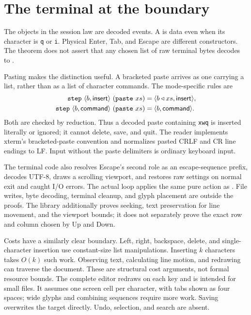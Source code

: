 \documentclass[11pt]{article}
\newcommand{\code}[1]{\texttt{\detokenize{#1}}}
\newcommand{\ins}{\mathbin{\triangleleft}}
\newcommand{\cmd}{\mathsf{command}}
\newcommand{\insertmode}{\mathsf{insert}}
\begin{document}
\section{The terminal at the boundary}
\label{sec:boundary}

The objects in the session law are decoded events. A \code{Key.character} is
data even when its character is \texttt{q} or \texttt{i}. Physical Enter, Tab,
and Escape are different constructors. The theorem does not assert that any
chosen list of raw terminal bytes decodes to \code{chars xs}.

Pasting makes the distinction useful. A bracketed paste arrives as one
\code{Key.paste} carrying a list, rather than as a list of character commands.
The mode-specific rules are
\begin{align*}
 \code{step}\ \langle b,\insertmode\rangle\ (\code{paste}\ xs)
   &=\langle b\ins xs,\insertmode\rangle,\\
 \code{step}\ \langle b,\cmd\rangle\ (\code{paste}\ xs)
   &=\langle b,\cmd\rangle.
\end{align*}
Both are checked by reduction. Thus a decoded paste containing \texttt{xwq}
is inserted literally or ignored; it cannot delete, save, and quit. The reader
implements xterm's bracketed-paste convention \citep{xterm} and normalizes
pasted CRLF and CR line endings to LF. Input without the paste delimiters is
ordinary keyboard input.

The terminal code also resolves Escape's second role as an escape-sequence
prefix, decodes UTF-8, draws a scrolling viewport, and restores raw settings
on normal exit and caught I/O errors. The actual loop applies the same pure
action as \code{step}. File writes, byte decoding, terminal cleanup, and glyph
placement are outside the proofs. The library additionally proves seeking,
text preservation for line movement, and the viewport bounds; it does not
separately prove the exact row and column chosen by Up and Down.

Costs have a similarly clear boundary. Left, right, backspace, delete, and
single-character insertion use constant-size list manipulations. Inserting
$k$ characters takes $O(k)$ such work. Observing text, calculating line motion,
and redrawing can traverse the document. These are structural cost arguments,
not formal resource bounds. The complete editor redraws on each key and is
intended for small files. It assumes one screen cell per character, with tabs
shown as four spaces; wide glyphs and combining sequences require more work.
Saving overwrites the target directly. Undo, selection, and search are absent.
\end{document}
